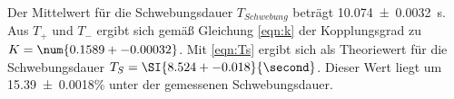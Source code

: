 Der Mittelwert für die Schwebungsdauer $T_{Schwebung}$
beträgt \SI{10.074 +-0.0032}{\second}.
Aus $T_+$ und $T_-$ ergibt sich gemäß Gleichung \ref{eqn:k} der Kopplungsgrad zu
$K = \num{0.1589 +- 0.00032}$. Mit \ref{eqn:Ts} ergibt sich als Theoriewert
für die Schwebungsdauer $T_S = \SI{8.524 +- 0.018}{\second}$. Dieser Wert liegt
um \num{15.39+-0.0018}\% unter der gemessenen Schwebungsdauer.
